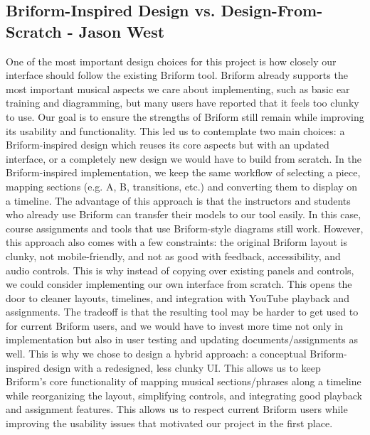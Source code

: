 \documentclass[12pt, letterpaper]{article}
\begin{document}
\subsection*{Briform-Inspired Design vs. Design-From-Scratch - Jason West}
One of the most important design choices for this project is how closely our interface should follow the existing Briform tool. Briform already supports the most important musical aspects we care about implementing, such as basic ear training and diagramming, but many users have reported that it feels too clunky to use. Our goal is to ensure the strengths of Briform still remain while improving its usability and functionality. This led us to contemplate two main choices: a Briform-inspired design which reuses its core aspects but with an updated interface, or a completely new design we would have to build from scratch. In the Briform-inspired implementation, we keep the same workflow of selecting a piece, mapping sections (e.g. A, B, transitions, etc.) and converting them to display on a timeline. The advantage of this approach is that the instructors and students who already use Briform can transfer their models to our tool easily. In this case, course assignments and tools that use Briform-style diagrams still work. However, this approach also comes with a few constraints: the original Briform layout is clunky, not mobile-friendly, and not as good with feedback, accessibility, and audio controls. This is why instead of copying over existing panels and controls, we could consider implementing our own interface from scratch. This opens the door to cleaner layouts, timelines, and integration with YouTube playback and assignments. The tradeoff is that the resulting tool may be harder to get used to for current Briform users, and we would have to invest more time not only in implementation but also in user testing and updating documents/assignments as well. This is why we chose to design a hybrid approach: a conceptual Briform-inspired design with a redesigned, less clunky UI. This allows us to keep Briform's core functionality of mapping musical sections/phrases along a timeline while reorganizing the layout, simplifying controls, and integrating good playback and assignment features. This allows us to respect current Briform users while improving the usability issues that motivated our project in the first place.
\end{document}
